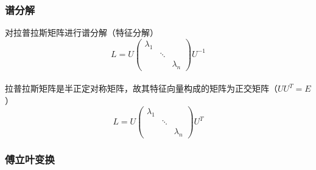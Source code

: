 \documentclass{beamer}
\begin{document}
\begin{frame}
    \frametitle{谱分解}
    对拉普拉斯矩阵进行谱分解（特征分解）\\
    $$L= U\left(\begin{matrix}\lambda_1 & \\&\ddots \\ &&\lambda_n \end{matrix}\right) U^{-1}$$\\
    拉普拉斯矩阵是半正定对称矩阵，故其特征向量构成的矩阵为正交矩阵（$UU^{T}=E$）\\
    $$L= U\left(\begin{matrix}\lambda_1 & \\&\ddots \\ &&\lambda_n \end{matrix}\right) U^{T}$$

\end{frame}

\begin{frame}
    \frametitle{傅立叶变换}
    
\end{frame}
\end{document}
